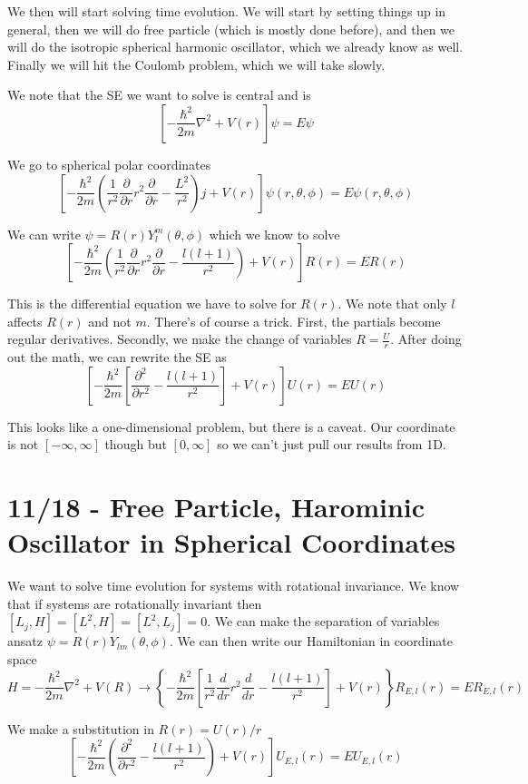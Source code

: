 \documentclass[10pt]{report}
\newcommand{\rd}[2]{\frac{d#1}{d#2}}
\newcommand{\pd}[2]{\frac{\partial #1}{\partial#2}}
\newcommand{\ptd}[2]{\frac{\partial^2 #1}{\partial#2^2}}
\begin{document}
We then will start solving time evolution. We will start by setting things up in general, then we will do free particle (which is mostly done before), and then we will do the isotropic spherical harmonic oscillator, which we already know as well. Finally we will hit the Coulomb problem, which we will take slowly. 

We note that the SE we want to solve is central and is
$$\left[ -\frac{\hbar^2}{2m}\nabla^2 + V(r) \right]\psi = E\psi$$

We go to spherical polar coordinates
$$\left[ -\frac{\hbar^2}{2m}\left( \frac{1}{r^2}\pd{}{r}r^2\pd{}{r} - \frac{L^2}{r^2} \right)j+V(r) \right]\psi(r,\theta,\phi) = E\psi(r,\theta,\phi)$$

We can write $\psi = R(r) Y_l^m(\theta,\phi)$ which we know to solve 
$$\left[ -\frac{\hbar^2}{2m}\left( \frac{1}{r^2} \pd{}{r}r^2\pd{}{r} - \frac{l(l+1)}{r^2} \right) + V(r) \right]R(r) = ER(r)$$

This is the differential equation we have to solve for $R(r)$. We note that only $l$ affects $R(r)$ and not $m$. There's of course a trick. First, the partials become regular derivatives. Secondly, we make the change of variables $R = \frac{U}{r}$. After doing out the math, we can rewrite the SE as
$$\left[-\frac{\hbar^2}{2m}\left[ \ptd{}{r}-\frac{l(l+1)}{r^2} \right] + V(r)\right] U(r) = EU(r)$$

This looks like a one-dimensional problem, but there is a caveat. Our coordinate is not $\left[ -\infty,\infty \right]$ though but $\left[ 0,\infty \right]$ so we can't just pull our results from 1D. 

\chapter{11/18 - Free Particle, Harominic Oscillator in Spherical Coordinates}

We want to solve time evolution for systems with rotational invariance. We know that if systems are rotationally invariant then $\left[ L_j,H \right] = \left[ L^2, H \right] = \left[ L^2, L_j \right] = 0$. We can make the separation of variables ansatz $\psi = R(r) Y_{lm}(\theta,\phi)$. We can then write our Hamiltonian in coordinate space
$$H = -\frac{\hbar^2}{2m}\nabla^2 + V(R) \to \left\{-\frac{\hbar^2}{2m}\left[ \frac{1}{r^2}\rd{}{r}r^2\rd{}{r} - \frac{l(l+1)}{r^2} \right]+V(r)\right\}R_{E,l}(r) = ER_{E,l}(r)$$

We make a substitution in $R(r) = U(r)/r$
$$\left[ -\frac{\hbar^2}{2m}\left( \ptd{}{r} - \frac{l(l+1)}{r^2} \right) + V(r) \right]U_{E,l}(r) = EU_{E,l}(r)$$
\end{document}
